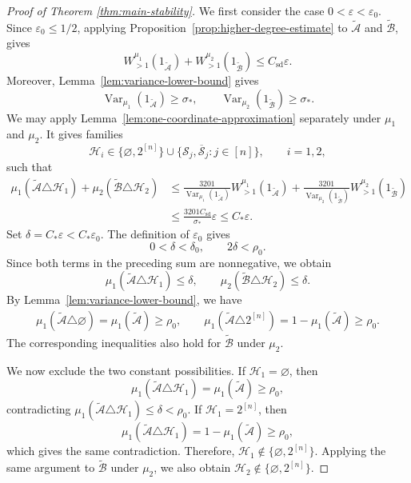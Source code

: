 \documentclass[11pt]{article}
\numberwithin{equation}{section}
\theoremstyle{definition}
\theoremstyle{remark}
\begin{document}
\begin{proof}[Proof of Theorem \ref{thm:main-stability}]
We first consider the case
$
0<\varepsilon<\varepsilon_0.
$
Since $\varepsilon_0\leq1/2$,
applying Proposition~\ref{prop:higher-degree-estimate} to
$\widetilde{\mathcal A}$ and $\widetilde{\mathcal B}$, gives
$$
W_{>1}^{\mu_1}(1_{\widetilde{\mathcal A}})
+
W_{>1}^{\mu_2}(1_{\widetilde{\mathcal B}})
\leq
C_{\mathrm{sd}}\varepsilon.
$$
Moreover,
Lemma~\ref{lem:variance-lower-bound} gives
$$
\operatorname{Var}_{\mu_1}(1_{\widetilde{\mathcal A}})
\geq
\sigma_*,
\qquad
\operatorname{Var}_{\mu_2}(1_{\widetilde{\mathcal B}})
\geq
\sigma_*.
$$
We may apply
Lemma~\ref{lem:one-coordinate-approximation} separately under
$\mu_1$ and $\mu_2$. It gives families
$$
\mathcal H_i
\in
\{\varnothing,2^{[n]}\}
\cup
\{\mathcal S_j,\overline{\mathcal S}_j:j\in[n]\},
\qquad i=1,2,
$$
such that
$$
\begin{aligned}
\mu_1(\widetilde{\mathcal A}\triangle\mathcal H_1)
+
\mu_2(\widetilde{\mathcal B}\triangle\mathcal H_2)
&\leq
\frac{3201}
{\operatorname{Var}_{\mu_1}(1_{\widetilde{\mathcal A}})}
W_{>1}^{\mu_1}(1_{\widetilde{\mathcal A}})
+
\frac{3201}
{\operatorname{Var}_{\mu_2}(1_{\widetilde{\mathcal B}})}
W_{>1}^{\mu_2}(1_{\widetilde{\mathcal B}})\\
&\leq
\frac{3201C_{\mathrm{sd}}}{\sigma_*}\varepsilon\leq
C_*\varepsilon.
\end{aligned}
$$
Set
$
\delta=C_*\varepsilon<C_*\varepsilon_0.
$
The definition of $\varepsilon_0$ gives
$$
0<\delta<\delta_0,
\qquad
2\delta<\rho_0.
$$
Since both terms in the preceding sum are nonnegative, we obtain
$$
\mu_1(\widetilde{\mathcal A}\triangle\mathcal H_1)
\leq\delta,
\qquad
\mu_2(\widetilde{\mathcal B}\triangle\mathcal H_2)
\leq\delta.
$$
By Lemma~\ref{lem:variance-lower-bound}, we have
\begin{align}
\mu_1(\widetilde{\mathcal A}\triangle\varnothing)
=
\mu_1(\widetilde{\mathcal A})
\geq
\rho_0,\qquad
\mu_1(\widetilde{\mathcal A}\triangle2^{[n]})
=
1-\mu_1(\widetilde{\mathcal A})
\geq
\rho_0.\label{f36}
\end{align}
The corresponding inequalities also hold for
$\widetilde{\mathcal B}$ under $\mu_2$. 

We now exclude the two constant possibilities. If
$\mathcal H_1=\varnothing$, then
$$
\mu_1(\widetilde{\mathcal A}\triangle\mathcal H_1)
=
\mu_1(\widetilde{\mathcal A})
\geq
\rho_0,
$$
contradicting
$
\mu_1(\widetilde{\mathcal A}\triangle\mathcal H_1)
\leq
\delta
<
\rho_0.
$
If $\mathcal H_1=2^{[n]}$, then
$$
\mu_1(\widetilde{\mathcal A}\triangle\mathcal H_1)
=
1-\mu_1(\widetilde{\mathcal A})
\geq
\rho_0,
$$
which gives the same contradiction. Therefore,
$
\mathcal H_1\notin\{\varnothing,2^{[n]}\}.
$
Applying the same argument to $\widetilde{\mathcal B}$ under
$\mu_2$, we also obtain
$
\mathcal H_2\notin\{\varnothing,2^{[n]}\}.
$


\end{proof}
\end{document}
